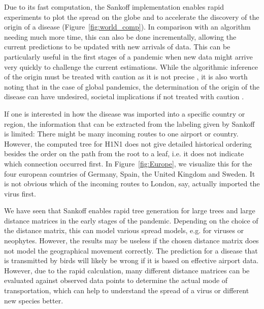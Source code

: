 \documentclass{article}
\begin{document}
Due to its fast computation, the Sankoff implementation enables rapid
experiments to plot the spread on the globe and to accelerate the discovery 
of the origin of a disease
(Figure~\ref{fig:world_comp}). In comparison with an algorithm needing much more time,
this can also be done incrementally, allowing the current predictions to be
updated with new arrivals of data. This can be particularly useful in the first stages
of a pandemic when new data might arrive very quickly to challenge the current
estimations. While the algorithmic inference of the origin must be
treated with caution as it is not precise
\cite{reimeringPhylogeographicReconstructionUsing2020}, it is also worth noting
that in the case of global pandemics, the determination of the origin of the
disease can have undesired, societal implications if not treated with caution
\cite{chenPotentialImpactCOVID192020}.

If one is interested in how the disease was imported into a specific country or
region, the information that can be extracted from the labeling given by Sankoff
is limited: There might be many incoming routes to one airport or country. However,
the computed tree for H1N1 does not give detailed historical ordering besides
the order on the path from the root to a leaf, i.e. it
does not indicate which connection occurred first. In Figure~\ref{fig:Europe},
we visualize this for the four european countries of Germany, Spain, the United
Kingdom and Sweden. It is not obvious which of the incoming routes to London,
say, actually imported the virus first.

We have seen that Sankoff enables rapid tree generation for large trees and
large distance matrices in the early stages of the pandemic. Depending on the
choice of the distance matrix, this can model various spread models, e.g. for
viruses or neophytes. However, the results may be useless if the chosen distance
matrix does not model the geographical movement correctly. The prediction for a
disease that is transmitted by birds will likely be wrong if it is based on
effective airport data. However, due to the rapid calculation, many different
distance matrices can be evaluated against observed data points to determine the
actual mode of transportation, which can help to understand the spread of a
virus or different new species better.
\end{document}
